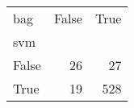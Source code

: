 \begin{tabular}{lrr}
\toprule
bag &  False &  True  \\
svm   &        &        \\
\midrule
False &     26 &     27 \\
True  &     19 &    528 \\
\bottomrule
\end{tabular}
